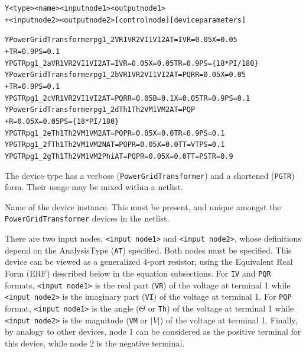 \begin{Device}\label{PowerGridTransformer}

\device
\begin{alltt}
Y<type> <name> <input node1> <output node1> 
+ <input node2> <output node2> [control node] [device parameters] 
\end{alltt}
  
\examples
\begin{alltt}
YPowerGridTransformer pg1_2 VR1 VR2 VI1 VI2 AT=IV R=0.05 X=0.05 
+ TR=0.9 PS=0.1
YPGTR pg1_2a VR1 VR2 VI1 VI2 AT=IV R=0.05 X=0.05 TR=0.9 PS=\{18*PI/180\}
YPowerGridTransformer pg1_2b VR1 VR2 VI1 VI2 AT=PQR R=0.05 X=0.05 
+ TR=0.9 PS=0.1
YPGTR pg1_2c VR1 VR2 VI1 VI2 AT=PQR R=0.05 B=0.1 X=0.05 TR=0.9 PS=0.1
YPowerGridTransformer pg1_2d Th1 Th2 VM1 VM2 AT=PQP 
+ R=0.05 X=0.05 PS=\{18*PI/180\}
YPGTR pg1_2e Th1 Th2 VM1 VM2 AT=PQP R=0.05 X=0.0 TR=0.9 PS=0.1
YPGTR pg1_2f Th1 Th2 VM1 VM2 N AT=PQP R=0.05 X=0.0 TT=VT PS=0.1
YPGTR pg1_2g Th1 Th2 VM1 VM2 Phi AT=PQP R=0.05 X=0.0 TT=PS TR=0.9
\end{alltt}

\parameters 
\begin{Parameters}
The device type has a verbose (\texttt{PowerGridTransformer}) and a shortened
(\texttt{PGTR}) form.  Their usage may be mixed within a netlist.

Name of the device instance.  This must be present, and unique amongst the 
\texttt{PowerGridTransformer} devices in the netlist.

There are two input nodes, \texttt{<input node1>} and \texttt{<input node2>}, 
whose definitions depend on the AnalysisType (\texttt{AT}) specified.  Both nodes
must be specified.  This device can be viewed as a generalized 4-port resistor, using
the Equivalent Real Form (ERF) described below in the equation subsections. For 
\texttt{IV} and \texttt{PQR} formats, \texttt{<input node1>} is the real part 
(\texttt{VR}) of the voltage at terminal 1 while \texttt{<input node2>} is the 
imaginary part (\texttt{VI}) of the voltage at terminal 1.  
For \texttt{PQP} format, \texttt{<input node1>} is the angle ($\Theta$ or \texttt{Th}) of the voltage 
at terminal 1 while \texttt{<input node2>} is the magnitude (\texttt{VM} or $|V|$) of the 
voltage at terminal 1.  Finally, by analogy to other \Xyce{} devices, node 1 can be 
considered as the positive terminal for this device, while node 2 is the negative
terminal.


\end{Parameters}
\end{Device}
